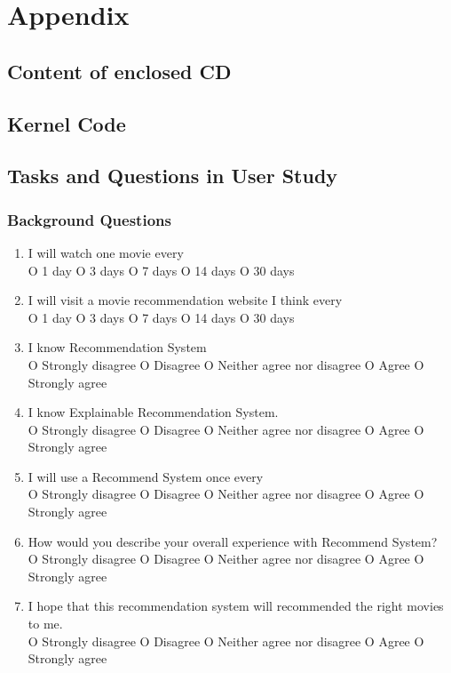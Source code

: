 \section{Appendix}
\label{ch:appendix}

\subsection{Content of enclosed CD}
\subsection{Kernel Code}
\subsection{Tasks and Questions in User Study}
\subsubsection{Background Questions}

\begin{enumerate}

\item  I will watch one movie every\\

O 1 day  O 3 days O 7 days O 14 days O 30 days

\item  I will visit a movie recommendation website I think every\\

O 1 day  O 3 days O 7 days O 14 days O 30 days

\item  I know Recommendation System\\

O Strongly disagree O Disagree O Neither agree nor disagree O Agree O Strongly agree

\item  I know Explainable Recommendation System.\\

O Strongly disagree O Disagree O Neither agree nor disagree O Agree O Strongly agree

\item  I will use a Recommend System once every\\

O Strongly disagree O Disagree O Neither agree nor disagree O Agree O Strongly agree

\item  How would you describe your overall experience with Recommend System?\\

O Strongly disagree O Disagree O Neither agree nor disagree O Agree O Strongly agree

\item  I hope that this recommendation system will recommended the right movies to me.\\

O Strongly disagree O Disagree O Neither agree nor disagree O Agree O Strongly agree

\end{enumerate}

